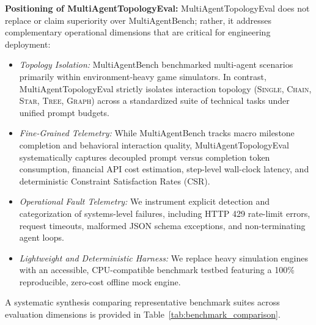 \textbf{Positioning of MultiAgentTopologyEval:} MultiAgentTopologyEval does not replace or claim superiority over MultiAgentBench; rather, it addresses complementary operational dimensions that are critical for engineering deployment:
\begin{itemize}
    \item \textit{Topology Isolation:} MultiAgentBench benchmarked multi-agent scenarios primarily within environment-heavy game simulators. In contrast, MultiAgentTopologyEval strictly isolates interaction topology (\textsc{Single}, \textsc{Chain}, \textsc{Star}, \textsc{Tree}, \textsc{Graph}) across a standardized suite of technical tasks under unified prompt budgets.
    \item \textit{Fine-Grained Telemetry:} While MultiAgentBench tracks macro milestone completion and behavioral interaction quality, MultiAgentTopologyEval systematically captures decoupled prompt versus completion token consumption, financial API cost estimation, step-level wall-clock latency, and deterministic Constraint Satisfaction Rates (CSR).
    \item \textit{Operational Fault Telemetry:} We instrument explicit detection and categorization of systems-level failures, including HTTP 429 rate-limit errors, request timeouts, malformed JSON schema exceptions, and non-terminating agent loops.
    \item \textit{Lightweight and Deterministic Harness:} We replace heavy simulation engines with an accessible, CPU-compatible benchmark testbed featuring a 100\% reproducible, zero-cost offline mock engine.
\end{itemize}
A systematic synthesis comparing representative benchmark suites across evaluation dimensions is provided in Table~\ref{tab:benchmark_comparison}.


